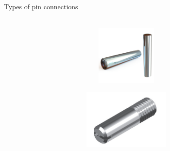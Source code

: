 \documentclass[aspectratio=169]{beamer}
\begin{document}
\begin{frame}[t]{Types of pin connections}
    \framesubtitle{}
    \vspace{-0.6cm}
    \begin{columns}[T,onlytextwidth]
        \begin{column}{0.69\textwidth}
            \begin{figure}[H]
                \begin{subfigure}{0.49\textwidth}
                    \centering\includegraphics[height=3cm,width=1\textwidth,keepaspectratio]{pin_1.png}
                    \label{fig:pin_1.png}
                \end{subfigure}
                \begin{subfigure}{0.49\textwidth}
                    \centering\includegraphics[height=3cm,width=1\textwidth,keepaspectratio]{pin_2.png}
                    \label{fig:pin_2.png}
                \end{subfigure}


\end{figure}
\end{column}
\end{columns}
\end{frame}
\end{document}
